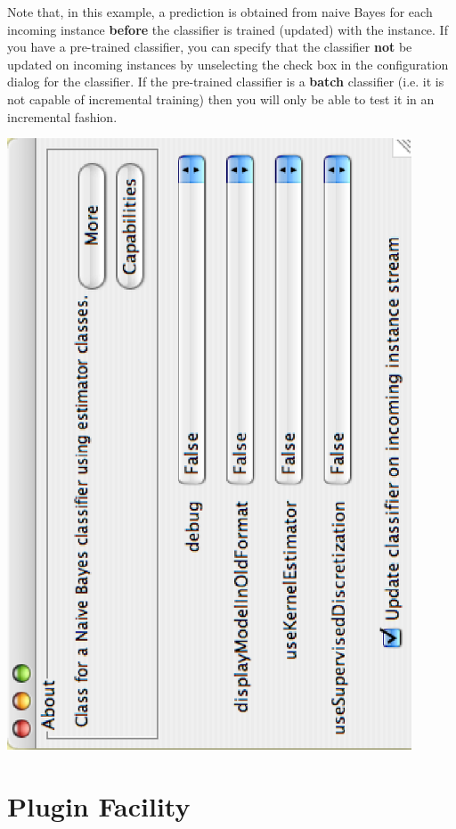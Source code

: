 \documentclass[a4paper]{article}
\begin{document}
Note that, in this example, a prediction is obtained from naive Bayes
for each incoming instance {\bf before} the classifier is trained
(updated) with the instance. If you have a pre-trained classifier, you
can specify that the classifier {\bf not} be updated on incoming
instances by unselecting the check box in the configuration dialog for
the classifier. If the pre-trained classifier is a {\bf batch}
classifier (i.e. it is not capable of incremental training) then you
will only be able to test it in an incremental fashion.

\begin{center}
  \includegraphics[angle=270,width=12cm]{images/IncrementalClassifierConfig.eps}
\end{center}

\newpage
\section{Plugin Facility}
\end{document}
